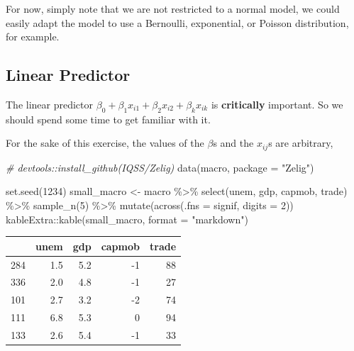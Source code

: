 \documentclass[
]{book}
\newenvironment{Shaded}{\begin{snugshade}}{\end{snugshade}}
\newcommand{\AttributeTok}[1]{\textcolor[rgb]{0.77,0.63,0.00}{#1}}
\newcommand{\CommentTok}[1]{\textcolor[rgb]{0.56,0.35,0.01}{\textit{#1}}}
\newcommand{\DecValTok}[1]{\textcolor[rgb]{0.00,0.00,0.81}{#1}}
\newcommand{\FunctionTok}[1]{\textcolor[rgb]{0.00,0.00,0.00}{#1}}
\newcommand{\NormalTok}[1]{#1}
\newcommand{\OtherTok}[1]{\textcolor[rgb]{0.56,0.35,0.01}{#1}}
\newcommand{\SpecialCharTok}[1]{\textcolor[rgb]{0.00,0.00,0.00}{#1}}
\newcommand{\StringTok}[1]{\textcolor[rgb]{0.31,0.60,0.02}{#1}}
\begin{document}
For now, simply note that we are not restricted to a normal model, we
could easily adapt the model to use a Bernoulli, exponential, or Poisson
distribution, for example.

\hypertarget{linear-predictor}{%
\subsection{Linear Predictor}\label{linear-predictor}}

The linear predictor
\(\beta_0 + \beta_1 x_{i1} + \beta_2 x_{i2} + \beta_k x_{ik}\) is
\textbf{critically} important. So we should spend some time to get
familiar with it.

For the sake of this exercise, the values of the \(\beta\)s and the
\(x_{ij}\)s are arbitrary,

\begin{Shaded}
\begin{Highlighting}[]
\CommentTok{\# devtools::install\_github(\textquotesingle{}IQSS/Zelig\textquotesingle{})}
\FunctionTok{data}\NormalTok{(macro, }\AttributeTok{package =} \StringTok{"Zelig"}\NormalTok{)}

\FunctionTok{set.seed}\NormalTok{(}\DecValTok{1234}\NormalTok{)}
\NormalTok{small\_macro }\OtherTok{\textless{}{-}}\NormalTok{ macro }\SpecialCharTok{\%\textgreater{}\%}
  \FunctionTok{select}\NormalTok{(unem, gdp, capmob, trade) }\SpecialCharTok{\%\textgreater{}\%}
  \FunctionTok{sample\_n}\NormalTok{(}\DecValTok{5}\NormalTok{) }\SpecialCharTok{\%\textgreater{}\%}
  \FunctionTok{mutate}\NormalTok{(}\FunctionTok{across}\NormalTok{(}\AttributeTok{.fns =}\NormalTok{ signif, }\AttributeTok{digits =} \DecValTok{2}\NormalTok{)) }
\NormalTok{kableExtra}\SpecialCharTok{::}\FunctionTok{kable}\NormalTok{(small\_macro, }\AttributeTok{format =} \StringTok{"markdown"}\NormalTok{)}
\end{Highlighting}
\end{Shaded}

\begin{longtable}[]{@{}lrrrr@{}}
\toprule
& unem & gdp & capmob & trade \\
\midrule
\endhead
284 & 1.5 & 5.2 & -1 & 88 \\
336 & 2.0 & 4.8 & -1 & 27 \\
101 & 2.7 & 3.2 & -2 & 74 \\
111 & 6.8 & 5.3 & 0 & 94 \\
133 & 2.6 & 5.4 & -1 & 33 \\
\bottomrule
\end{longtable}
\end{document}
